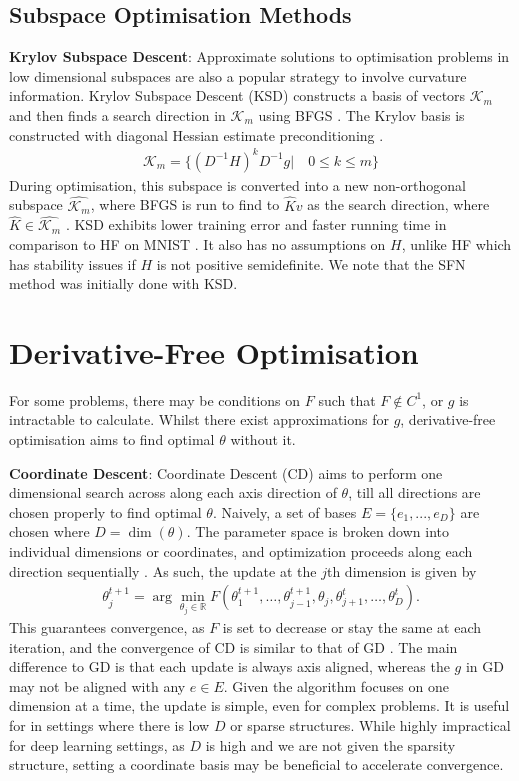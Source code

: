 \subsection{Subspace Optimisation Methods}\label{sec:subspace_opt}

\textbf{Krylov Subspace Descent}: Approximate solutions to optimisation problems in low dimensional subspaces are also a popular strategy to involve curvature information. Krylov Subspace Descent (KSD) constructs a basis of vectors $\mathcal{K}_m$ and then finds a search direction in $\mathcal{K}_m$ using BFGS \citep{vinyals2012krylov}. The Krylov basis is constructed with diagonal Hessian estimate preconditioning \citep{vinyals2012krylov}.
\begin{align}
    \mathcal{K}_m = \{(D^{-1}H)^{k}D^{-1}g | \quad 0 \leq k \leq m \}
\end{align}
During optimisation, this subspace is converted into a new non-orthogonal subspace $\hat{\mathcal{K}_m}$, where BFGS is run to find to ${\hat{K}v}$ as the search direction, where $\hat{K} \in \hat{\mathcal{K}_m}$ \citep{vinyals2012krylov}. KSD exhibits lower training error and faster running time in comparison to HF on MNIST \citep{vinyals2012krylov}. It also has no assumptions on $H$, unlike HF which has stability issues if $H$ is not positive semidefinite. We note that the SFN method was initially done with KSD. 

\section{Derivative-Free Optimisation}
For some problems, there may be conditions on $F$ such that $F \notin C^1$, or $g$ is intractable to calculate. Whilst there exist approximations for $g$, derivative-free optimisation aims to find optimal $\theta$ without it.

\textbf{Coordinate Descent}: Coordinate Descent (CD) aims to perform one dimensional search across along each axis direction of $\theta$, till all directions are chosen properly to find optimal $\theta$. Naively, a set of bases $E = \{e_1, ..., e_D \}$ are chosen where $D = \dim(\theta)$. The parameter space is broken down into individual dimensions or coordinates, and optimization proceeds along each direction sequentially \citep{conn2009derivfree}. As such, the update at the $j$th dimension is given by
\begin{align}
\theta^{t+1}_j = \arg\min_{\theta_j \in \mathbb{R}} F(\theta^{t+1}_1, \dots, \theta^{t+1}_{j-1}, \theta_j, \theta^t_{j+1}, \dots, \theta^t_D).
\end{align}
This guarantees convergence, as $F$ is set to decrease or stay the same at each iteration, and the convergence of CD is similar to that of GD \citep{conn2009derivfree}. The main difference to GD is that each update is always axis aligned, whereas the $g$ in GD may not be aligned with any $e \in E$. Given the algorithm focuses on one dimension at a time, the update is simple, even for complex problems. It is useful for in settings where there is low $D$ or sparse structures. While highly impractical for deep learning settings, as $D$ is high and we are not given the sparsity structure, setting a coordinate basis may be beneficial to accelerate convergence.

